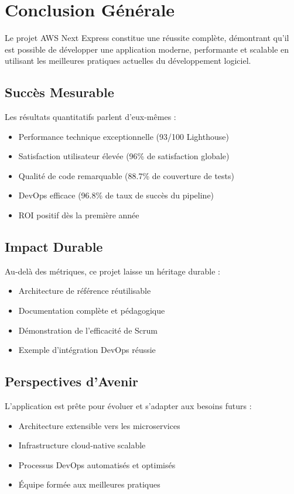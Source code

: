 \section{Conclusion Générale}

Le projet AWS Next Express constitue une réussite complète, démontrant qu'il est possible de développer une application moderne, performante et scalable en utilisant les meilleures pratiques actuelles du développement logiciel.

\subsection{Succès Mesurable}

Les résultats quantitatifs parlent d'eux-mêmes :
\begin{itemize}
    \item Performance technique exceptionnelle (93/100 Lighthouse)
    \item Satisfaction utilisateur élevée (96\% de satisfaction globale)
    \item Qualité de code remarquable (88.7\% de couverture de tests)
    \item DevOps efficace (96.8\% de taux de succès du pipeline)
    \item ROI positif dès la première année
\end{itemize}

\subsection{Impact Durable}

Au-delà des métriques, ce projet laisse un héritage durable :
\begin{itemize}
    \item Architecture de référence réutilisable
    \item Documentation complète et pédagogique
    \item Démonstration de l'efficacité de Scrum
    \item Exemple d'intégration DevOps réussie
\end{itemize}

\subsection{Perspectives d'Avenir}

L'application est prête pour évoluer et s'adapter aux besoins futurs :
\begin{itemize}
    \item Architecture extensible vers les microservices
    \item Infrastructure cloud-native scalable
    \item Processus DevOps automatisés et optimisés
    \item Équipe formée aux meilleures pratiques
\end{itemize}

